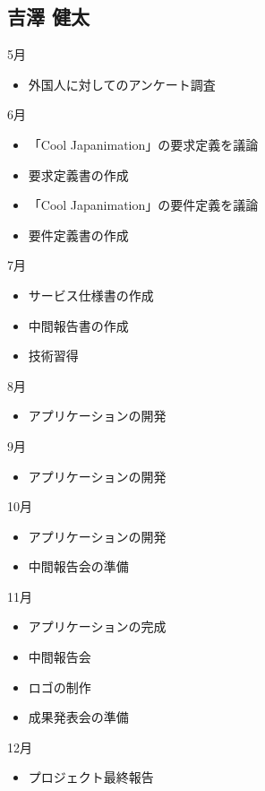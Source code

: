 \subsection{吉澤 健太}
5月
\begin{itemize}
\item 外国人に対してのアンケート調査
\end{itemize}
6月
\begin{itemize}
\item 「Cool Japanimation」の要求定義を議論
\item 要求定義書の作成
\item 「Cool Japanimation」の要件定義を議論
\item 要件定義書の作成
\end{itemize}
7月
\begin{itemize}
\item サービス仕様書の作成
\item 中間報告書の作成
\item 技術習得
\end{itemize}
8月
\begin{itemize}
\item アプリケーションの開発
\end{itemize}
9月
\begin{itemize}
\item アプリケーションの開発
\end{itemize}
10月
\begin{itemize}
\item アプリケーションの開発
\item 中間報告会の準備
\end{itemize}
11月
\begin{itemize}
\item アプリケーションの完成
\item 中間報告会
\item ロゴの制作
\item 成果発表会の準備
\end{itemize}
12月
\begin{itemize}
\item プロジェクト最終報告
\end{itemize}
